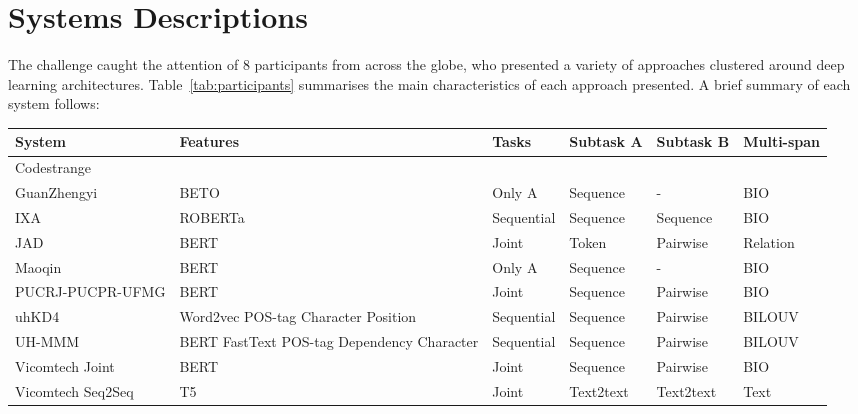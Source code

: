 \documentclass[a4paper,11pt,twocolumn,twoside]{article}
\begin{document}
\section{Systems Descriptions}\label{sec:systems}

The challenge caught the attention of 8 participants from across the globe,
who presented a variety of approaches clustered around deep learning architectures.
Table~\ref{tab:participants} summarises the main characteristics of each approach presented.
A brief summary of each system follows:

\begin{table*}[ht]
  \centering
  \begin{tabularx}{\textwidth}{lXllll}
    \toprule
    System & Features & Tasks & Subtask A & Subtask B & Multi-span \\
    \midrule
    Codestrange & 				 \\
    GuanZhengyi & BETO & Only A & Sequence & - & BIO \\
    IXA & ROBERTa & Sequential & Sequence & Sequence & BIO \\
    JAD & BERT & Joint & Token & Pairwise & Relation \\
    Maoqin & BERT & Only A & Sequence & - & BIO \\
    PUCRJ-PUCPR-UFMG & BERT & Joint & Sequence & Pairwise & BIO \\
    uhKD4 & Word2vec POS-tag Character Position & Sequential & Sequence & Pairwise & BILOUV \\
    UH-MMM & BERT FastText POS-tag Dependency Character & Sequential & Sequence & Pairwise & BILOUV \\
    Vicomtech Joint & BERT & Joint & Sequence & Pairwise & BIO \\
    Vicomtech Seq2Seq & T5 & Joint & Text2text & Text2text & Text \\
    \bottomrule
  \end{tabularx}
  \caption{Summary of the approaches presented at the eHealth-KD Challenge.\label{tab:participants}}
\end{table*}
\end{document}
